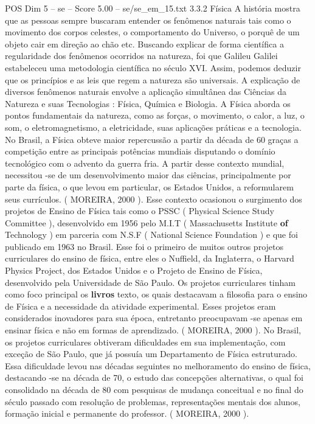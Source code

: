 \begin{textsample}{POS Dim 5 – se – Score 5.00 – se/se\_em\_15.txt}  \label{ex:f5_pos_139}
3.3.2 Física A história mostra que as pessoas sempre buscaram entender os fenômenos naturais tais como o movimento dos corpos celestes, o comportamento do Universo, o porquê de um objeto cair em direção ao chão etc.
Buscando explicar de forma científica a regularidade dos fenômenos ocorridos na natureza, foi que Galileu Galilei estabeleceu uma metodologia científica no século XVI.
Assim, podemos deduzir que os princípios e as leis que regem a natureza são universais.
A explicação de diversos fenômenos naturais envolve a aplicação simultânea das Ciências da Natureza e suas Tecnologias : Física, Química e Biologia.
A Física aborda os pontos fundamentais da natureza, como as forças, o movimento, o calor, a luz, o som, o eletromagnetismo, a eletricidade, suas aplicações práticas e a tecnologia.
No Brasil, a Física obteve maior repercussão a partir da década de 60 graças a competição entre as principais potências mundiais disputando o domínio tecnológico com o advento da guerra fria.
A partir desse contexto mundial, necessitou -se de um desenvolvimento maior das ciências, principalmente por parte da física, o que levou em particular, os Estados Unidos, a reformularem seus currículos. ( MOREIRA, 2000 ).
Esse contexto ocasionou o surgimento dos projetos de Ensino de Física tais como o PSSC ( Physical Science Study Committee ), desenvolvido em 1956 pelo M.I.T ( Massachusetts Institute \textbf{of} Technology ) em parceria com N.S.F ( National Science Foundation ) e que foi publicado em 1963 no Brasil.
Esse foi o primeiro de muitos outros projetos curriculares do ensino de física, entre eles o Nuffield, da Inglaterra, o Harvard Physics Project, dos Estados Unidos e o Projeto de Ensino de Física, desenvolvido pela Universidade de São Paulo.
Os projetos curriculares tinham como foco principal os \textbf{livros} texto, os quais destacavam a filosofia para o ensino de Física e a necessidade da atividade experimental.
Esses projetos eram considerados inovadores para sua época, entretanto preocupavam -se apenas em ensinar física e não em formas de aprendizado. ( MOREIRA, 2000 ).
No Brasil, os projetos curriculares obtiveram dificuldades em sua implementação, com exceção de São Paulo, que já possuía um Departamento de Física estruturado.
Essa dificuldade levou nas décadas seguintes no melhoramento do ensino de física, destacando -se na década de 70, o estudo das concepções alternativas, o qual foi consolidado na década de 80 com pesquisas de mudança conceitual e no final do século passado com resolução de problemas, representações mentais dos alunos, formação inicial e permanente do professor. ( MOREIRA, 2000 ).

\end{textsample}
